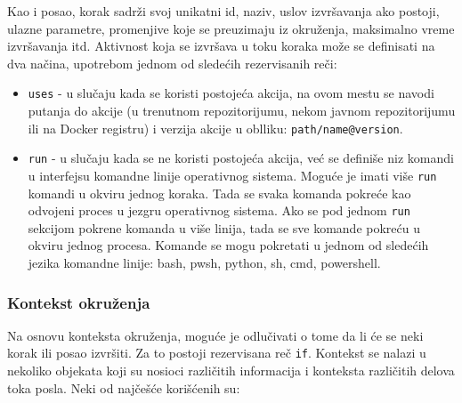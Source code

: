 \documentclass[12pt]{report}
\begin{document}
Kao i posao, korak sadrži svoj unikatni id, naziv, uslov izvršavanja ako postoji, ulazne parametre, promenjive koje se preuzimaju iz okruženja, maksimalno vreme izvršavanja itd. Aktivnost koja se izvršava u toku koraka može se definisati na dva načina, upotrebom jednom od sledećih rezervisanih reči:

\begin{itemize}
    \item\texttt{uses} - u slučaju kada se koristi postojeća akcija, na ovom mestu se navodi putanja do akcije (u trenutnom repozitorijumu, nekom javnom repozitorijumu ili na Docker registru) i verzija akcije u oblliku: \texttt{path/name@version}.
    \item\texttt{run} - u slučaju kada se ne koristi postojeća akcija, već se definiše niz komandi u interfejsu komandne linije operativnog sistema. Moguće je imati više \texttt{run} komandi u okviru jednog koraka. Tada se svaka komanda pokreće kao odvojeni proces u jezgru operativnog sistema. Ako se pod jednom \texttt{run} sekcijom pokrene komanda u više linija, tada se sve komande pokreću u okviru jednog procesa. Komande se mogu pokretati u jednom od sledećih jezika komandne linije: bash, pwsh, python, sh, cmd, powershell.
\end{itemize}

\subsubsection{Kontekst okruženja}
Na osnovu konteksta okruženja, moguće je odlučivati o tome da li će se neki korak ili posao izvršiti. Za to postoji rezervisana reč \texttt{if}. Kontekst se nalazi u nekoliko objekata koji su nosioci različitih informacija i konteksta različitih delova toka posla. Neki od najčešće korišćenih su:
\end{document}
